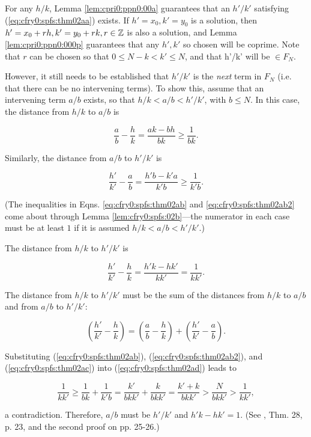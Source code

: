 \begin{vworktheoremproof}
For any $h/k$, Lemma \cprizeroxrefhyphen\ref{lem:cpri0:ppn0:00a} guarantees
that an $h'/k'$ satisfying (\ref{eq:cfry0:spfs:thm02aa}) exists.
If $h'=x_0, k'=y_0$ is a solution, then
$h'=x_0 + r h, k'=y_0 + r k, r \in {\mathbb{Z}}$ is also
a solution, and Lemma \cprizeroxrefhyphen\ref{lem:cpri0:ppn0:000p}
guarantees that any $h', k'$ so chosen will be coprime.
Note that $r$ can be chosen so that $0 \leq N-k < k' \leq N$, and
that h'/k' will be $\in F_N$.

However, it still needs to be established that $h'/k'$ is the
\emph{next} term in $F_N$ (i.e. that there can be no intervening
terms).  To show this, assume that an intervening term
$a/b$ exists, so that $h/k < a/b < h'/k'$, with $b \leq N$.
In this case, the distance from $h/k$ to $a/b$ is

\begin{equation}
\label{eq:cfry0:spfs:thm02ab}
\frac{a}{b}-\frac{h}{k} = \frac{ak-bh}{bk} \geq \frac{1}{bk} .
\end{equation}

Similarly, the distance from $a/b$ to $h'/k'$ is

\begin{equation}
\label{eq:cfry0:spfs:thm02ab2}
\frac{h'}{k'}-\frac{a}{b} = \frac{h'b-k'a}{k'b} \geq \frac{1}{k'b} .
\end{equation}

(The inequalities in Eqns. \ref{eq:cfry0:spfs:thm02ab}
and \ref{eq:cfry0:spfs:thm02ab2} come
about through Lemma \ref{lem:cfry0:spfs:02b}---the numerator
in each case must be at least $1$ if it is assumed 
$h/k < a/b < h'/k'$.)

The distance from $h/k$ to $h'/k'$ is

\begin{equation}
\label{eq:cfry0:spfs:thm02ac}
\frac{h'}{k'}-\frac{h}{k} = \frac{h'k-hk'}{kk'} = \frac{1}{kk'} .
\end{equation}

The distance from $h/k$ to $h'/k'$ must be the sum of the distances
from $h/k$ to $a/b$ and from $a/b$ to $h'/k'$:

\begin{equation}
\label{eq:cfry0:spfs:thm02ad}
\left( { \frac{h'}{k'} - \frac{h}{k} } \right)
=
\left( { \frac{a}{b} - \frac{h}{k} } \right)
+
\left( { \frac{h'}{k'} - \frac{a}{b} } \right) .
\end{equation}

Substituting (\ref{eq:cfry0:spfs:thm02ab}),
(\ref{eq:cfry0:spfs:thm02ab2}), 
and (\ref{eq:cfry0:spfs:thm02ac}) 
into (\ref{eq:cfry0:spfs:thm02ad}) leads 
to

\begin{equation}
\label{eq:cfry0:spfs:thm02ae}
\frac{1}{kk'}
\geq
\frac{1}{bk}+\frac{1}{k'b}
=\frac{k'}{bkk'}+\frac{k}{bkk'}
=\frac{k'+k}{bkk'}
>
\frac{N}{bkk'}
>
\frac{1}{kk'} ,
\end{equation}

a contradiction.  Therefore, $a/b$ must be $h'/k'$ and 
$h'k-hk'=1$.  (See \cite{bibref:b:HardyAndWrightClassic}, Thm. 28, p. 23,
and the second proof on pp. 25-26.)
\end{vworktheoremproof}


